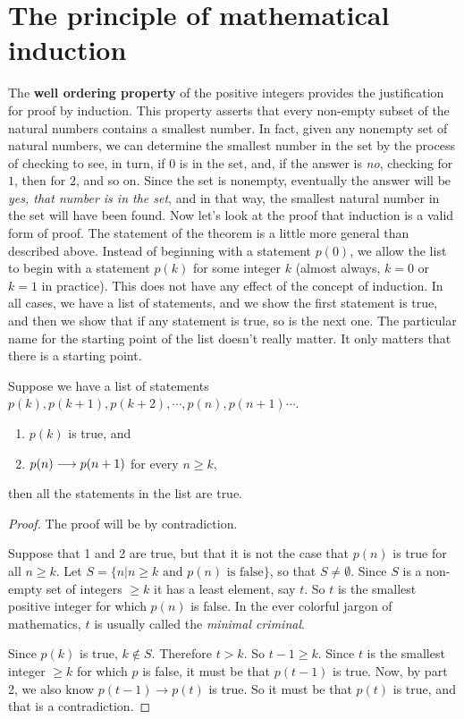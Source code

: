 \section{The principle of mathematical induction}
The {\bfseries well ordering property} of the positive integers provides the
justification for proof by induction. This property asserts that every
non-empty subset of the natural numbers contains a smallest number. In fact, given
any nonempty set of natural numbers, we can determine the smallest number
in the set by the process of checking to see, in turn, if $0$ is in the set,
and, if the answer is {\itshape no}, checking for $1$, then for $2$, and so on.
Since the set is nonempty, eventually the answer will be {\itshape yes, that
number is in the set}, and in that way, the smallest natural number in the
set will have been found. Now let's look at the proof that induction is a valid
form of proof. The statement of the theorem is a little more general than 
described above. Instead of beginning with a statement $p(0)$, we allow
the list to begin with a statement $p(k)$ for some integer $k$ (almost always,
$k=0$ or $k=1$ in practice). This does not have any effect of the concept
of induction. In all cases, we have a list of statements, and we show the
first statement is true, and then we show that if any statement is true, so is the
next one. The particular name for the starting point of the list doesn't really matter.
It only matters that there is a starting point.


\begin{thm}  
Suppose we have a list of statements %
$p(k), p(k+1), p(k+2),\cdots, p(n), p(n+1)\cdots$. 
\begin{enumerate}
 \item $p(k)$ is true, and
 \item $p(n)\longrightarrow p(n+1)$ for every $n\geq k$,
\end{enumerate}
then all the statements in the list are true.
\end{thm}
\begin{proof}
 The proof will be by contradiction.
 
 Suppose that 1 and 2 are true, but that it is not the case that $p(n)$ 
 is true for all $n\geq k$.
 Let $S=\{n | n\geq k \text{ and } p(n) \text{ is false}\}$, so that 
  $S\neq \emptyset$.
 Since $S$ is a non-empty set of integers $\geq k$
  it has a least element, say
 $t$. So $t$ is the
 smallest positive integer for which $p(n)$ is false.
 In the ever colorful jargon of mathematics, $t$ is usually
 called the {\itshape minimal criminal}.
 
 Since $p(k)$ is true, $k\notin S$. Therefore $t>k$. 
 So $t-1\geq k$.
 Since $t$ is the smallest integer $\geq k$ for which $p$ is false,
 it must be that   $p(t-1)$ is true. 
 Now, by part 2, we also know $p(t-1)\to p(t)$ is true. So it must be that
 $p(t)$ is true, and that is a contradiction.
\end{proof}

